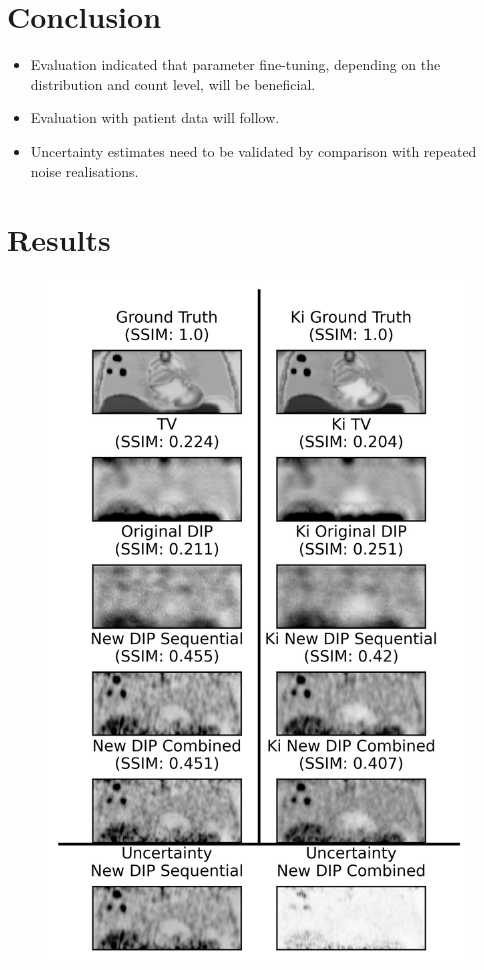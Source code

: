 \documentclass[portrait, color=UCLburgundy, margin=1cm]{uclposter}
\begin{document}
\begin{multicols}{2}
        \section*{Conclusion}
            \begin{highlightbox}[UCLlightgreen]
                \begin{itemize}
                    \item Evaluation indicated that parameter fine-tuning, depending on the distribution and count level, will be beneficial.
                    \item Evaluation with patient data will follow.
                    \item Uncertainty estimates need to be validated by comparison with repeated noise realisations.
                \end{itemize}
            \end{highlightbox}
        
        \AtNextBibliography{\tiny}
        \printbibliography
        
        \section*{Results}
            \begin{figure}[H]
                \centering
                
                \includegraphics[width=0.9\linewidth]{visual_analysis.png}
                

\end{figure}
\end{multicols}
\end{document}
